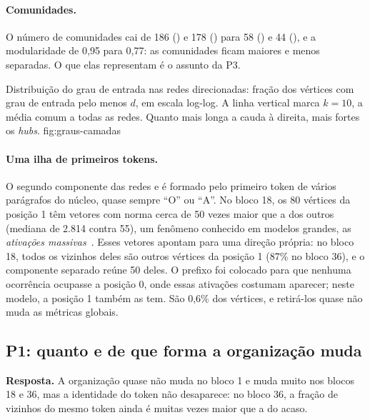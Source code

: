 \paragraph{Comunidades.} O número de comunidades cai de 186 () e 178 () para
58 () e 44 (), e a modularidade de 0,95 para 0,77: as comunidades ficam
maiores e menos separadas. O que elas representam é o assunto da P3.

    {Distribuição do grau de entrada nas redes direcionadas: fração dos vértices com grau de
    entrada pelo menos $d$, em escala log-log. A linha vertical marca $k=10$, a média comum
    a todas as redes. Quanto mais longa a cauda à direita, mais fortes os \emph{hubs}.}
    {fig:graus-camadas}

\paragraph{Uma ilha de primeiros tokens.} O segundo componente das redes  e
 é formado pelo primeiro token de vários parágrafos do núcleo, quase sempre ``O'' ou
``A''. No bloco 18, os 80 vértices da posição 1 têm vetores com norma cerca de 50 vezes maior
que a dos outros (mediana de 2.814 contra 55), um fenômeno conhecido em modelos grandes, as
\emph{ativações massivas}~\cite{sun2024}. Esses vetores apontam para uma direção própria: no
bloco 18, todos os vizinhos deles são outros vértices da posição 1 (87\% no bloco 36), e o
componente separado reúne 50 deles. O prefixo  foi colocado para que
nenhuma ocorrência ocupasse a posição 0, onde essas ativações costumam aparecer; neste modelo,
a posição 1 também as tem. São 0,6\% dos vértices, e retirá-los quase não muda as métricas
globais.

\subsection{P1: quanto e de que forma a organização muda}\label{sec:res-p1}

\textbf{Resposta.} A organização quase não muda no bloco 1 e muda muito nos blocos 18 e 36,
mas a identidade do token não desaparece: no bloco 36, a fração de vizinhos do mesmo token
ainda é muitas vezes maior que a do acaso.

